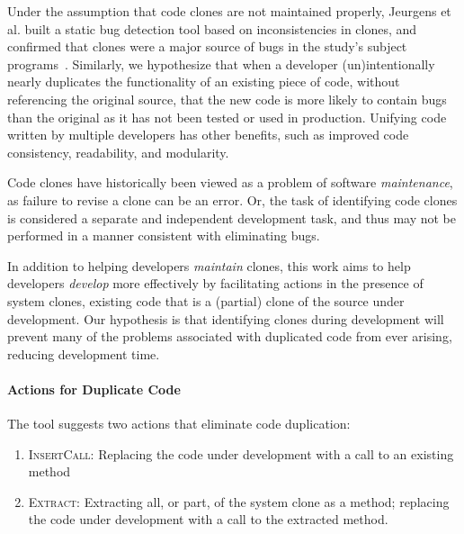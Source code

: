 \documentclass[nocopyrightspace,10pt]{sigplanconf}
\begin{document}

Under the assumption that code clones are not maintained properly,
Jeurgens et al. built a static bug detection tool based on
inconsistencies in clones, and confirmed that clones were a major
source of bugs in the study's subject programs~\cite{Juergens2009}.
Similarly, we hypothesize that when a developer (un)intentionally
nearly duplicates the functionality of an existing piece of code, without
referencing the original source, that the new code is more likely to
contain bugs than the original as it has not been tested or used in
production. Unifying code written by multiple developers has other 
benefits, such as improved code consistency, readability, and modularity.

Code clones have historically been viewed as a problem of software
\emph{maintenance}, as failure to revise a clone can be an error. 
Or, the task of identifying code clones is considered a separate and
independent development task, and thus may not be performed in a
manner consistent with eliminating bugs.

In addition to helping developers \emph{maintain} clones, this work
aims to help developers \emph{develop} more effectively by
facilitating actions in the presence of system clones, existing code
that is a (partial) clone of the source under development.  Our hypothesis
 is that identifying clones during development will prevent many of the problems
associated with duplicated code from ever arising, reducing development time.

\paragraph{Actions for Duplicate Code}

The tool suggests two actions that eliminate code duplication:

\begin{enumerate}
  \item \textsc{InsertCall}: Replacing the code under development with a call to an existing method
  \item \textsc{Extract}: Extracting all, or part, of the system clone as a method;
    replacing the code under development with a call to the extracted
    method.
\end{enumerate}
\end{document}
